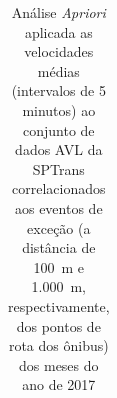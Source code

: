 \documentclass{beamer}
\begin{document}
\begin{frame}
\begin{table}[!htb]
\centering
\begin{adjustbox}{max height=10mm, width=3in}
\begin{threeparttable}
\caption {Análise \textit{Apriori} aplicada as velocidades médias (intervalos de 5 minutos) ao conjunto de dados AVL da SPTrans correlacionados aos eventos de exceção (a distância de 100~m e 1.000~m, respectivamente, dos pontos de rota dos ônibus) dos meses do ano de 2017}
\label {tab:aprioriExceptFullShapes}
\begin{tabular}{c|c|c|c|c|c}
\toprule



\end{tabular}
\end{threeparttable}
\end{adjustbox}
\end{table}
\end{frame}
\end{document}
